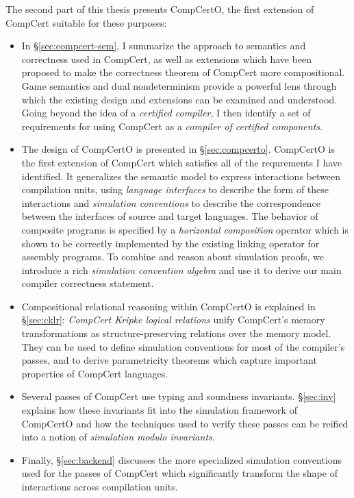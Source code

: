\documentclass[draft,11pt]{report}
\theoremstyle{definition}
\begin{document}
The second part of this thesis presents CompCertO,
the first extension of CompCert suitable for
these purposes:
\begin{itemize}
\item
  In \S\ref{sec:compcert-sem},
  I summarize the approach to semantics and correctness
  used in CompCert,
  as well as extensions
  which have been proposed
  to make the correctness theorem of CompCert
  more compositional.
  Game semantics and dual nondeterminism
  provide a powerful lens
  through which the existing design and extensions
  can be examined and understood.
  Going beyond the idea of a
  \emph{certified compiler},
  I then identify a set of requirements
  for using CompCert as a
  \emph{compiler of certified components}.
\item
  The design of CompCertO is presented in \S\ref{sec:compcerto}.
  CompCertO is the first extension of CompCert which
  satisfies all of the requrements I have identified.
  It generalizes the semantic model
  to express interactions between compilation units,
  using \emph{language interfaces}
  to describe the form of these interactions
  and \emph{simulation conventions}
  to describe the correspondence between the interfaces
  of source and target languages.
  The behavior of
  composite programs is specified by a
  \emph{horizontal composition} operator
  which is shown to be correctly implemented
  by the existing linking operator for assembly programs.
  To combine and reason about simulation proofs,
  we introduce a rich \emph{simulation convention algebra}
  and use it to derive our main compiler correctness statement.
\item
  Compositional relational reasoning within CompCertO
  is explained in \S\ref{sec:cklr}:
  \emph{CompCert Kripke logical relations}
  unify CompCert's memory transformations
  as structure-preserving relations
  over the memory model.
  They can be used to define simulation conventions
  for most of the compiler's passes,
  and to derive parametricity theorems which capture
  important properties of CompCert languages.
\item
  Several passes of CompCert use
  typing and soundness invariants.
  \S\ref{sec:inv} explains how these invariants fit
  into the simulation framework of CompCertO and
  how the techniques used to verify these passes
  can be reified into a notion of
  \emph{simulation modulo invariants}.
\item
  Finally, \S\ref{sec:backend}
  discusses the more specialized simulation conventions
  used for the passes of CompCert which significantly transform
  the shape of interactions across compilation units.
\end{itemize}
\end{document}
